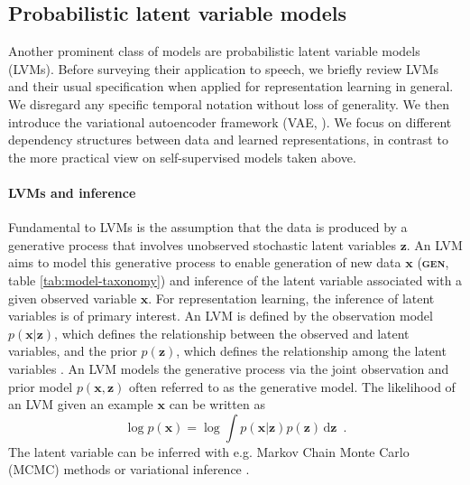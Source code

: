 \subsection{Probabilistic latent variable models}
\label{sec:plvms}
Another prominent class of models are probabilistic latent variable models (LVMs). 
Before surveying their application to speech, we briefly review LVMs and their usual specification when applied for representation learning in general. We disregard any specific temporal notation without loss of generality. 
We then introduce the variational autoencoder framework (VAE, \citealp{kingma_auto-encoding_2014}). We focus on different dependency structures between data and learned representations, in contrast to the more practical view on self-supervised models taken above.

\paragraph{LVMs and inference}
Fundamental to LVMs is the assumption that the data is produced by a generative process that involves unobserved stochastic latent variables $\textbf{z}$. 
An LVM aims to model this generative process to enable generation of new data $\mathbf{x}$ (\textbf{\textsc{gen}}, table \ref{tab:model-taxonomy}) and inference of the latent variable associated with a given observed variable $\textbf{x}$. 
For representation learning, the inference of latent variables is of primary interest.
An LVM is defined by the observation model $p(\mathbf{x}|\mathbf{z})$, which defines the relationship between the observed and latent variables, and the prior $p(\mathbf{z})$, which defines the relationship among the latent variables \cite{bartholomew_latent_2011}. 
An LVM models the generative process via the joint observation and prior model $p(\mathbf{x}, \mathbf{z})$ often referred to as the generative model. 
The likelihood of an LVM given an example $\textbf{x}$ can be written as
\begin{equation}
    \log p(\mathbf{x}) = \log \int p(\mathbf{x}|\mathbf{z}) p(\mathbf{z}) \,\text{d}\mathbf{z} \enspace.
    \label{eq: lvm log-likelihood}
\end{equation}
The latent variable can be inferred with e.g. Markov Chain Monte Carlo (MCMC) methods \cite{mohamed_monte_2019} or variational inference \cite{jordan_introduction_1999}.

